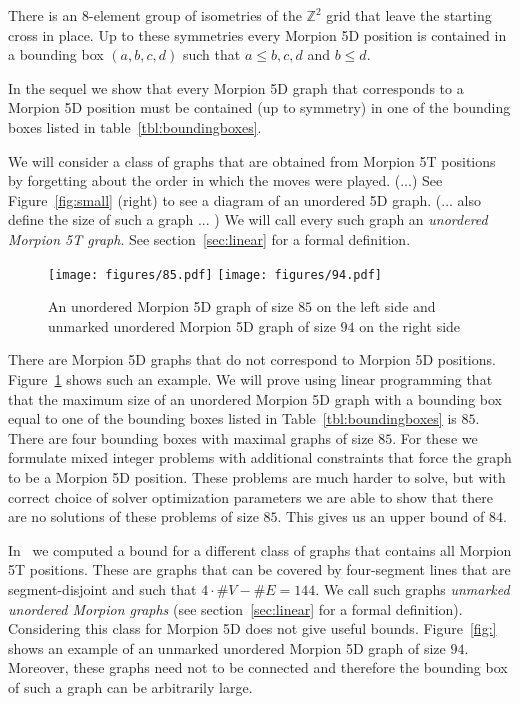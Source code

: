 \documentclass[a4paper,UKenglish]{lipics}
\begin{document}
There is an $8$-element group of isometries of the $\mathbb{Z}^2$ grid that leave the starting cross in place.
Up to these symmetries every Morpion 5D position is contained in a bounding box $(a,b,c,d)$ such that
  $a \leq b,c,d$ and $b \leq d$.

In the sequel we show that every Morpion 5D graph that corresponds to a Morpion 5D position
    must be contained (up to symmetry) in one of the bounding boxes listed in table~\ref{tbl:boundingboxes}.

\begin{table}[ht]
\centering
 

\caption{}
\label{tbl:boundingboxes}
\end{table}

We will consider a class of graphs that are obtained from Morpion 5T positions by forgetting about 
  the order in which the moves were played.
(...) See Figure~\ref{fig:small} (right) to see a diagram of an unordered 5D graph. (... also define the size of such a graph ... )
We will call every such graph an \emph{unordered Morpion 5T graph}. See section~\ref{sec:linear} for a formal definition.

\begin{figure}[h]
    \texttt{[image: figures/85.pdf]}
    \texttt{[image: figures/94.pdf]}
    \caption{\label{fig:85}
      An unordered Morpion 5D graph of size $85$ on the left side
        and unmarked unordered Morpion 5D graph of size $94$ on the right side
    }
\end{figure}

There are Morpion 5D graphs that do not correspond to Morpion 5D positions.
Figure~\ref{fig:85} shows such an example.
We will prove using linear programming that that the maximum size of  an unordered Morpion 5D graph with 
  a bounding box equal to one of the bounding boxes listed in Table~\ref{tbl:boundingboxes}
  is $85$.
There are four bounding boxes with maximal graphs of size $85$. 
For these we formulate mixed integer problems with additional constraints that force the graph to
  be a Morpion 5D position.
These problems are much harder to solve, but with correct choice of solver optimization parameters we are able to show
  that there are no solutions of these problems of size $85$.
This gives us an upper bound of $84$.

In~\cite{} we computed a bound for a different class of graphs that contains all Morpion 5T positions.
These are graphs that can be covered by four-segment lines that are segment-disjoint and such that $4\cdot \# V - \# E = 144$.
We call such graphs \emph{unmarked unordered Morpion graphs} (see section~\ref{sec:linear} for a formal definition).
Considering this class for Morpion 5D  does not give useful bounds. 
Figure~\ref{fig:} shows an example of an unmarked unordered Morpion 5D graph of size $94$.
Moreover, these graphs need not to be connected and therefore the bounding box of such a graph
  can be arbitrarily large.
  
\end{document}
